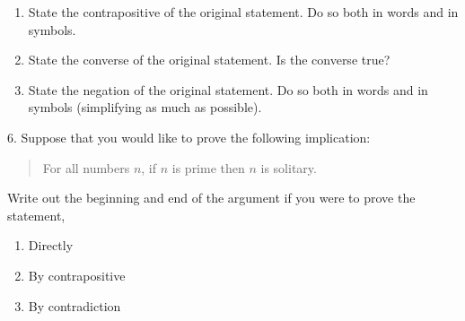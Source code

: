 \documentclass[10pt,]{book}
\theoremstyle{plain}
\theoremstyle{definition}
\theoremstyle{definition}
\theoremstyle{definition}
\numberwithin{equation}{chapter}
\begin{document}
\begin{exerciselist}
\begin{enumerate}[label=(\alph*)]
\item\hypertarget{li-1187}{}
                State the contrapositive of the original statement. Do so both in words and in symbols.


\item\hypertarget{li-1188}{}
                State the converse of the original statement. Is the converse true?


\item\hypertarget{li-1189}{}
                State the negation of the original statement. Do so both in words and in symbols (simplifying as much as possible).


\end{enumerate}
\par\smallskip
\item[6.]\hypertarget{exercise-260}{}
            Suppose that you would like to prove the following implication:
\par

            \begin{quote}
              For all numbers \(n\), if \(n\) is prime then \(n\) is solitary.
            \end{quote}

\par

            Write out the beginning and end of the argument if you were to prove the statement,
\leavevmode%
\begin{enumerate}[label=(\alph*)]
\item\hypertarget{li-1190}{}
                Directly


\item\hypertarget{li-1191}{}
                By contrapositive


\item\hypertarget{li-1192}{}
                By contradiction


\end{enumerate}
\par


\end{exerciselist}
\end{document}
